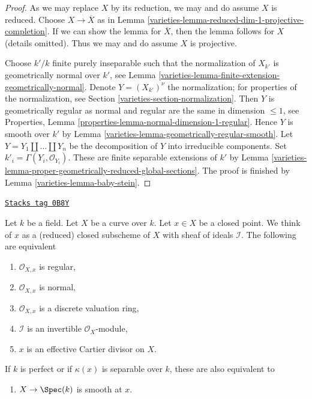 \begin{proof}

As we may replace $X$ by its reduction, we may and do assume $X$ is reduced.
Choose $X \to \overline{X}$ as in
Lemma \ref{varieties-lemma-reduced-dim-1-projective-completion}.
If we can show the lemma for $\overline{X}$, then the lemma follows
for $X$ (details omitted).
Thus we may and do assume $X$ is projective.

\medskip\noindent
Choose $k'/k$ finite purely inseparable such that the normalization of
$X_{k'}$ is geometrically normal over $k'$, see
Lemma \ref{varieties-lemma-finite-extension-geometrically-normal}.
Denote $Y = (X_{k'})^\nu$ the normalization; for properties
of the normalization, see Section \ref{varieties-section-normalization}.
Then $Y$ is geometrically regular as normal and regular are the same
in dimension $\leq 1$, see
Properties, Lemma \ref{properties-lemma-normal-dimension-1-regular}.
Hence $Y$ is smooth over $k'$ by
Lemma \ref{varieties-lemma-geometrically-regular-smooth}.
Let $Y = Y_1 \amalg \ldots \amalg Y_n$ be the decomposition
of $Y$ into irreducible components.
Set $k'_i = \Gamma(Y_i, \mathcal{O}_{Y_i})$.
These are finite separable extensions of $k'$ by
Lemma \ref{varieties-lemma-proper-geometrically-reduced-global-sections}.
The proof is finished by Lemma \ref{varieties-lemma-baby-stein}.
\end{proof}

\begin{lemma}
\label{varieties-lemma-regular-point-on-curve}
\href{https://stacks.math.columbia.edu/tag/0B8Y}{\texttt{Stacks tag 0B8Y}}

Let $k$ be a field. Let $X$ be a curve over $k$. Let $x \in X$ be a closed
point. We think of $x$ as a (reduced) closed subscheme of $X$ with sheaf
of ideals $\mathcal{I}$. The following are equivalent
\begin{enumerate}
\item $\mathcal{O}_{X, x}$ is regular,
\item $\mathcal{O}_{X, x}$ is normal,
\item $\mathcal{O}_{X, x}$ is a discrete valuation ring,
\item $\mathcal{I}$ is an invertible $\mathcal{O}_X$-module,
\item $x$ is an effective Cartier divisor on $X$.
\end{enumerate}
If $k$ is perfect or if $\kappa(x)$ is separable over $k$,
these are also equivalent to
\begin{enumerate}
\item[(6)] $X \to \Spec(k)$ is smooth at $x$.
\end{enumerate}
\end{lemma}

